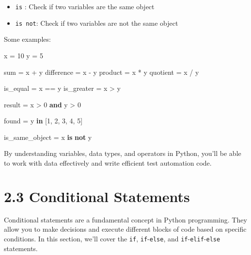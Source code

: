 \documentclass[
  paper=a4,
  ,captions=tableheading
]{scrartcl}
\newenvironment{Shaded}{}{}
\newcommand{\BuiltInTok}[1]{\textcolor[rgb]{0.00,0.50,0.00}{#1}}
\newcommand{\DecValTok}[1]{\textcolor[rgb]{0.25,0.63,0.44}{#1}}
\newcommand{\KeywordTok}[1]{\textcolor[rgb]{0.00,0.44,0.13}{\textbf{#1}}}
\newcommand{\NormalTok}[1]{#1}
\newcommand{\OperatorTok}[1]{\textcolor[rgb]{0.40,0.40,0.40}{#1}}
\providecommand{\tightlist}{%
  \setlength{\itemsep}{0pt}\setlength{\parskip}{0pt}}
\begin{document}
\begin{itemize}
  \begin{itemize}
  \tightlist
  \item
    \texttt{is} : Check if two variables are the same object
  \item
    \texttt{is\ not}: Check if two variables are not the same object
  \end{itemize}
\end{itemize}

Some examples:

\begin{Shaded}
\begin{Highlighting}[]

\NormalTok{x }\OperatorTok{=} \DecValTok{10}
\NormalTok{y }\OperatorTok{=} \DecValTok{5}

\BuiltInTok{sum} \OperatorTok{=}\NormalTok{ x }\OperatorTok{+}\NormalTok{ y}
\NormalTok{difference }\OperatorTok{=}\NormalTok{ x }\OperatorTok{{-}}\NormalTok{ y}
\NormalTok{product }\OperatorTok{=}\NormalTok{ x }\OperatorTok{*}\NormalTok{ y}
\NormalTok{quotient }\OperatorTok{=}\NormalTok{ x }\OperatorTok{/}\NormalTok{ y}

\NormalTok{is\_equal }\OperatorTok{=}\NormalTok{ x }\OperatorTok{==}\NormalTok{ y}
\NormalTok{is\_greater }\OperatorTok{=}\NormalTok{ x }\OperatorTok{\textgreater{}}\NormalTok{ y}

\NormalTok{result }\OperatorTok{=}\NormalTok{ x }\OperatorTok{\textgreater{}} \DecValTok{0} \KeywordTok{and}\NormalTok{ y }\OperatorTok{\textgreater{}} \DecValTok{0}

\NormalTok{found }\OperatorTok{=}\NormalTok{ y }\KeywordTok{in}\NormalTok{ [}\DecValTok{1}\NormalTok{, }\DecValTok{2}\NormalTok{, }\DecValTok{3}\NormalTok{, }\DecValTok{4}\NormalTok{, }\DecValTok{5}\NormalTok{]}

\NormalTok{is\_same\_object }\OperatorTok{=}\NormalTok{ x }\KeywordTok{is} \KeywordTok{not}\NormalTok{ y}
\end{Highlighting}
\end{Shaded}

By understanding variables, data types, and operators in Python, you'll
be able to work with data effectively and write efficient test
automation code.

\hypertarget{conditional-statements}{%
\section{2.3 Conditional Statements}\label{conditional-statements}}

Conditional statements are a fundamental concept in Python programming.
They allow you to make decisions and execute different blocks of code
based on specific conditions. In this section, we'll cover the
\texttt{if}, \texttt{if}-\texttt{else}, and
\texttt{if}-\texttt{elif}-\texttt{else} statements.
\end{document}
